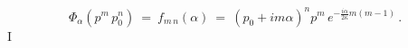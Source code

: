 \begin{equation} \Phi_\alpha(p^m\,p_0^n) \ = \ f_{m\,
n}(\alpha) \ = \ ( p_0 + i m \alpha )^n p^m\,e^{-\frac{i\alpha}{2
\kappa} m(m-1)}\, .\label{52}\end{equation}I

